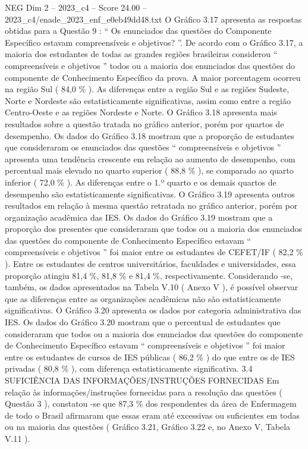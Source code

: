 \begin{textsample}{NEG Dim 2 – 2023\_c4 – Score 24.00 – 2023\_c4/enade\_2023\_enf\_e0eb49dd48.txt}
O Gráfico 3.17 apresenta as respostas obtidas para a Questão 9 : “ Os enunciados das questões do Componente Específico estavam compreensíveis e objetivos? ”.
De acordo com o Gráfico 3.17, a maioria dos estudantes de todas as grandes regiões brasileiras considerou “ compreensíveis e objetivos ” todos ou a maioria dos enunciados das questões do componente de Conhecimento Específico da prova.
A maior porcentagem ocorreu na região Sul ( 84,0 \% ).
As diferenças entre a região Sul e as regiões Sudeste, Norte e Nordeste são estatisticamente significativas, assim como entre a região Centro-Oeste e as regiões Nordeste e Norte.
O Gráfico 3.18 apresenta mais resultados sobre a questão tratada no gráfico anterior, porém por quartos de desempenho.
Os dados do Gráfico 3.18 mostram que a proporção de estudantes que consideraram os enunciados das questões “ compreensíveis e objetivos ” apresenta uma tendência crescente em relação ao aumento de desempenho, com percentual mais elevado no quarto superior ( 88,8 \% ), se comparado ao quarto inferior ( 72,0 \% ).
As diferenças entre o 1.º quarto e os demais quartos de desempenho são estatisticamente significativas.
O Gráfico 3.19 apresenta outros resultados em relação à mesma questão retratada no gráfico anterior, porém por organização acadêmica das IES.
Os dados do Gráfico 3.19 mostram que a proporção dos presentes que consideraram que todos ou a maioria dos enunciados das questões do componente de Conhecimento Específico estavam “ compreensíveis e objetivos ” foi maior entre os estudantes de CEFET/IF ( 82,2 \% ).
Entre os estudantes de centros universitários, faculdades e universidades, essa proporção atingiu 81,4 \%, 81,8 \% e 81,4 \%, respectivamente.
Considerando -se, também, os dados apresentados na Tabela V.10 ( Anexo V ), é possível observar que as diferenças entre as organizações acadêmicas não são estatisticamente significativas.
O Gráfico 3.20 apresenta os dados por categoria administrativa das IES.
Os dados do Gráfico 3.20 mostram que o percentual de estudantes que consideraram que todos ou a maioria dos enunciados das questões do componente de Conhecimento Específico estavam “ compreensíveis e objetivos ” foi maior entre os estudantes de cursos de IES públicas ( 86,2 \% ) do que entre os de IES privadas ( 80,8 \% ), com diferença estatisticamente significativa. 3.4 SUFICIÊNCIA DAS INFORMAÇÕES/INSTRUÇÕES FORNECIDAS Em relação às informações/instruções fornecidas para a resolução das questões ( Questão 3 ), constatou -se que 87,3 \% dos respondentes da área de Enfermagem de todo o Brasil afirmaram que essas eram até excessivas ou suficientes em todas ou na maioria das questões ( Gráfico 3.21, Gráfico 3.22 e, no Anexo V, Tabela V.11 ).

\end{textsample}
